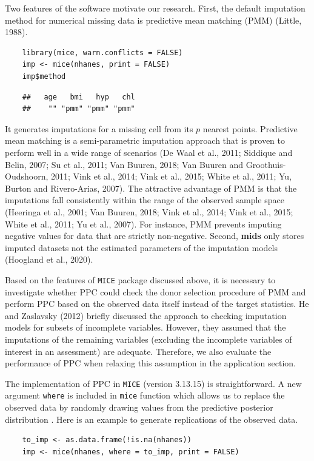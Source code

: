 \documentclass[12pt, fullpage, a4paper]{article}
\begin{document}
Two features of the software motivate our research. First, the default imputation method for numerical missing data is predictive mean matching (PMM) (Little, 1988)\nocite{Little1988}.
\begin{lstlisting}
	library(mice, warn.conflicts = FALSE)
	imp <- mice(nhanes, print = FALSE)
	imp$method
\end{lstlisting}
\begin{verbatim}
	##   age   bmi   hyp   chl 
	##    "" "pmm" "pmm" "pmm"
\end{verbatim}
It generates imputations for a missing cell from its $p$ nearest points. Predictive mean matching is a semi-parametric imputation approach that is proven to perform well in a wide range of scenarios (De Waal et al., 2011;\nocite{de2011handbook} Siddique and Belin, 2007;\nocite{siddique2008multiple} Su et al., 2011;\nocite{su2011multiple} Van Buuren, 2018; Van Buuren and Groothuis-Oudshoorn, 2011; Vink et al., 2014;\nocite{vink2014predictive} Vink et al., 2015;\nocite{vink2015partioned} White et al., 2011; Yu, Burton and Rivero-Arias, 2007\nocite{yu2007evaluation}). The attractive advantage of PMM is that the imputations fall consistently within the range of the observed sample space (Heeringa et al., 2001;\nocite{heeringa2001multivariate} Van Buuren, 2018; Vink et al., 2014; Vink et al., 2015; White et al., 2011; Yu et al., 2007). For instance, PMM prevents imputing negative values for data that are strictly non-negative. Second, \textbf{mids} only stores imputed datasets not the estimated parameters of the imputation models (Hoogland et al., 2020\nocite{hoogland2020handling}). 


Based on the features of \texttt{MICE} package discussed above, it is necessary to investigate whether PPC could check the donor selection procedure of PMM and perform PPC based on the observed data itself instead of the target statistics. He and Zaslavsky (2012) briefly discussed the approach to checking imputation models for subsets of incomplete variables. However, they assumed that the imputations of the remaining variables (excluding the incomplete variables of interest in an assessment) are adequate. Therefore, we also evaluate the performance of PPC when relaxing this assumption in the application section. 


The implementation of PPC in \texttt{MICE} (version 3.13.15) is straightforward. A new argument \texttt{where} is included in \texttt{mice} function which allows us to replace the observed data by randomly drawing values from the predictive posterior distribution \cite{volker2021anonymiced}. Here is an example to generate replications of the observed data.   
\begin{lstlisting}
	to_imp <- as.data.frame(!is.na(nhanes)) 
	imp <- mice(nhanes, where = to_imp, print = FALSE)
\end{lstlisting}
\end{document}
